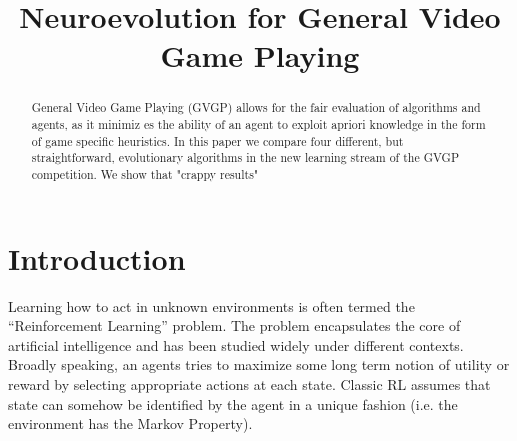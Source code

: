 \documentclass[conference]{IEEEtran}
\begin{document}
%
\title{Neuroevolution for General Video Game Playing}

\author{
}


\maketitle


\begin{abstract}
General Video Game Playing (GVGP) allows for the fair evaluation of algorithms and agents, as it minimiz es the ability of an agent to exploit apriori knowledge in the form of game specific heuristics. In this paper we compare four different, but straightforward, evolutionary algorithms in the new learning stream of the GVGP competition. We show that "crappy results"
\end{abstract}

\IEEEpeerreviewmaketitle

\section{Introduction} \label{sec:intro}

\cite{Perez2014}



Learning how to act in unknown environments is often termed the ``Reinforcement Learning'' problem\cite{RL}. The problem encapsulates the core of artificial intelligence and has been studied widely under different contexts. Broadly speaking, an agents tries to maximize some long term notion of utility or reward by selecting appropriate actions at each state. Classic RL assumes that state can somehow be identified by the agent in a unique fashion (i.e. the environment has the Markov Property). 
\end{document}
